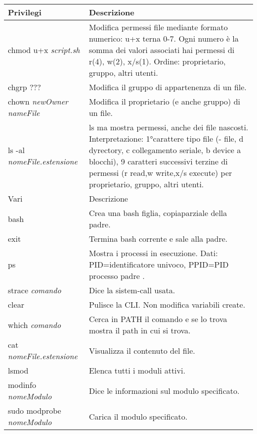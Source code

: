 \documentclass{article}
\newcommand{\sezione}[1]{\hline#1 & Descrizione\\\hline}
\begin{document}
\begin{tabularx}{\textwidth}{lX}
	\sezione{Privilegi}
	chmod u+x \textit{script.sh} & Modifica permessi file mediante formato numerico: u+x terna 0-7. Ogni numero è la somma dei valori associati hai permessi di r(4), w(2), x/s(1). Ordine: proprietario, gruppo, altri utenti.\\
	chgrp ??? & Modifica il gruppo di appartenenza di un file.\\
	chown \textit{newOwner nameFile} & Modifica il proprietario (e anche gruppo) di un file.\\
	ls -al \textit{nomeFile.estensione} & ls ma mostra permessi, anche dei file nascosti. Interpretazione: 1°carattere tipo file (- file, d dyrectory, c collegamento seriale, b device a blocchi), 9 caratteri successivi terzine di permessi (r read,w write,x/s execute) per proprietario, gruppo, altri utenti. \\

	\sezione{Vari}
	bash & Crea una bash figlia, copiaparziale della padre.\\
	exit & Termina bash corrente e sale alla padre.\\
	ps & Mostra i processi in esecuzione. Dati: PID=identificatore univoco, PPID=PID processo padre .\\
	strace \textit{comando} & Dice la sistem-call usata.\\
	clear & Pulisce la CLI. Non modifica variabili create.\\
	which \textit{comando} & Cerca in PATH il comando e se lo trova mostra il path in cui si trova. \\
	cat \textit{nomeFile.estensione} & Visualizza il contenuto del file.\\
	lsmod & Elenca tutti i moduli attivi.\\
	modinfo \textit{nomeModulo} & Dice le informazioni sul modulo specificato.\\
	sudo modprobe \textit{nomeModulo} & Carica il modulo specificato.\\
	\hline
	\end{tabularx}
\end{document}
